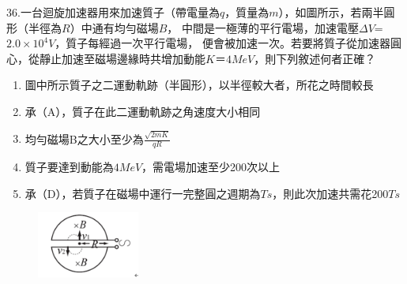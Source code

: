 \documentclass[cn,10pt,math=newtx,chinesefont=founder,device=ig]{elegantbook}
\begin{document}
\begin{example}
   36.一台迴旋加速器用來加速質子（帶電量為$q$，質量為$m$），如圖所示，若兩半圓形（半徑為$R$）中通有均勻磁場$B$，
  中間是一極薄的平行電場，加速電壓$\Delta V$=$2.0\times10^4V$，質子每經過一次平行電場，
   便會被加速一次。若要將質子從加速器圓心，從靜止加速至磁場邊緣時共增加動能$K$＝$4MeV$，則下列敘述何者正確？
   \begin{enumerate}[label=(\Alph*)]
     \item 圖中所示質子之二運動軌跡（半圓形），以半徑較大者，所花之時間較長
     \item 承（A），質子在此二運動軌跡之角速度大小相同
     \item 均勻磁場B之大小至少為$\frac{\sqrt{2mK}}{qR}$
     \item 質子要達到動能為$4MeV$，需電場加速至少200次以上
     \item 承（D），若質子在磁場中運行一完整圓之週期為$Ts$，則此次加速共需花200$Ts$ 
   \end{enumerate}
   
    \rightline{[成德高中教甄109]}
\end{example}
\begin{solution}
    
\end{solution}
\begin{figure}[htbp]
    \flushright
    \includegraphics[width=0.3\textwidth]{image/109成德36.png}
  \end{figure}
\newpage
\end{document}
